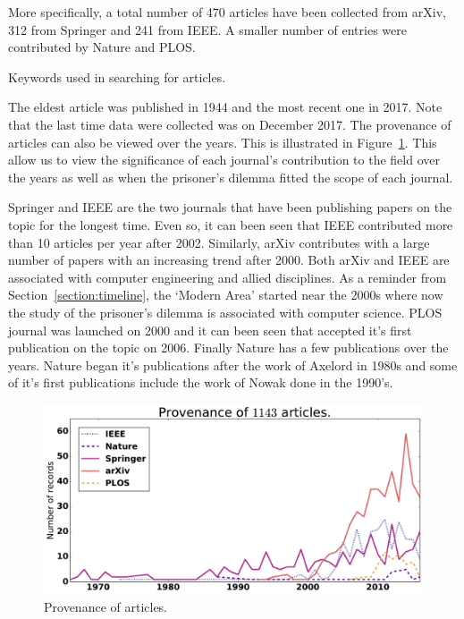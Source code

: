 \documentclass{article}
\begin{document}
More specifically, a total number of 470 articles have been collected from arXiv,
312 from Springer and 241 from IEEE. A smaller number of entries were
contributed by Nature and PLOS.

\begin{table}[!hbtp]
    \begin{center}
    
    \end{center}
    \caption{Keywords used in searching for articles.}
    \label{table:provenance}
\end{table}

The eldest article was published in 1944 and the most recent one in 2017. Note
that the last time data were collected was on December 2017. The provenance of
articles can also be viewed over the years. This is illustrated
in Figure~\ref{fig:provenance}. This allow us to view the significance of each
journal's contribution to the field over the years as well as when the prisoner's
dilemma fitted the scope of each journal. 

Springer and IEEE are the two journals that have been publishing papers on the 
topic for the longest time. Even so, it can been seen that IEEE contributed more
than 10 articles per year after 2002. Similarly, arXiv contributes with a large
number of papers with an increasing trend after 2000. Both arXiv and IEEE
are associated with computer engineering and allied disciplines. As a reminder
from Section~\ref{section:timeline}, the `Modern Area' started near the 2000s
where now the study of the prisoner's dilemma is associated with computer science.
PLOS journal was launched on 2000 and it can been seen that accepted it's first
publication on the topic on 2006. Finally Nature has a few publications over the
years. Nature began it's publications after the work of Axelord in 1980s and
some of it's first publications include the work of Nowak done in the 1990's.

\begin{figure}[!hbtp]
    \centering
    \includegraphics[width=.6\textwidth]{./assets/images/provenance.pdf}
    \caption{Provenance of articles.}
    \label{fig:provenance}
\end{figure}
\end{document}
